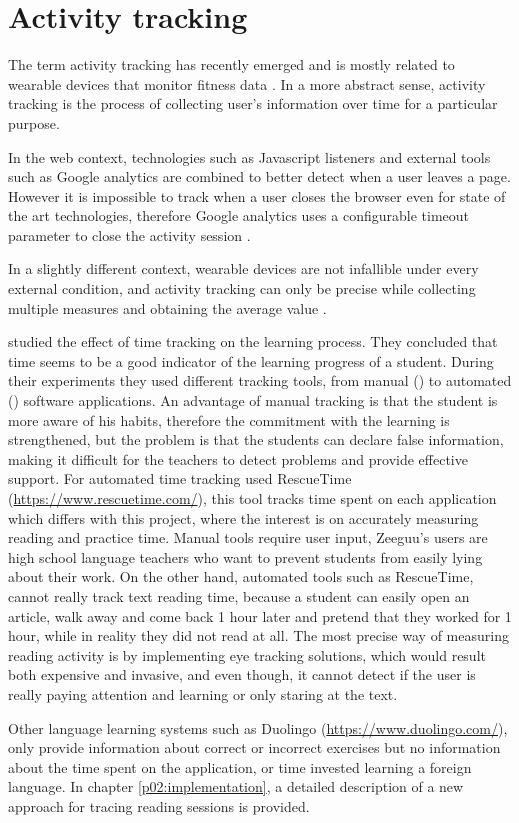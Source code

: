 \chapter{Activity tracking}

The term activity tracking has recently emerged and is mostly related to wearable devices that monitor fitness data \cite{Wikipedia2016}. In a more abstract sense, activity tracking is the process of collecting user's information over time for a particular purpose. 

In the web context, technologies such as Javascript listeners and external tools such as Google analytics are combined to better detect when a user leaves a page. However it is impossible to track when a user closes the browser even for state of the art technologies, therefore Google analytics uses a configurable timeout parameter to close the activity session \cite{Pierstorff2014}.

In a slightly different context, wearable devices \cite{Evenson2015} are not infallible under every external condition, and activity tracking can only be precise while collecting multiple measures and obtaining the average value \cite{El-Amrawy2015}.

\citeauthor{Santos2012} studied the effect of time tracking on the learning process. They concluded that time seems to be a good indicator of the learning progress of a student. During their experiments they used different tracking tools, from manual () to automated () software applications. An advantage of manual tracking is that the student is more aware of his habits, therefore the commitment with the learning is strengthened, but the problem is that the students can declare false information, making it difficult for the teachers to detect problems and provide effective support. For automated time tracking \citeauthor{Santos2012} used RescueTime (\url{https://www.rescuetime.com/}), this tool tracks time spent on each application which differs with this project, where the interest is on accurately measuring reading and practice time. Manual tools require user input, Zeeguu's users are high school language teachers who want to prevent students from easily lying about their work. On the other hand, automated tools such as RescueTime, cannot really track text reading time, because a student can easily open an article, walk away and come back 1 hour later and pretend that they worked for 1 hour, while in reality they did not read at all. The most precise way of measuring reading activity is by implementing eye tracking solutions, which would result both expensive and invasive, and even though, it cannot detect if the user is really paying attention and learning or only staring at the text.

Other language learning systems such as Duolingo (\url{https://www.duolingo.com/}), only provide information about correct or incorrect exercises but no information about the time spent on the application, or time invested learning a foreign language.
In chapter \ref{p02:implementation}, a detailed description of a new approach for tracing reading sessions is provided.